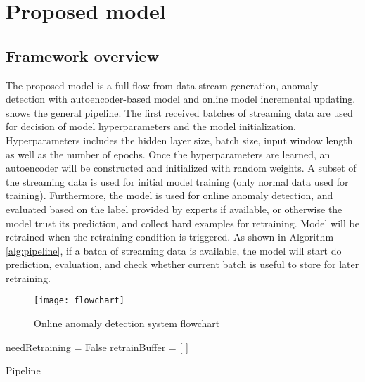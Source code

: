 \chapter{Proposed model}
\label{chap:Proposedmodel}

\section{Framework overview}
\label{sec:framework}

The proposed model is a full flow from data stream generation, anomaly detection with autoencoder-based model and online model incremental updating.  shows the general pipeline. The first received batches of streaming data are used for decision of model hyperparameters and the model initialization. Hyperparameters includes the hidden layer size, batch size, input window length as well as the number of epochs. Once the hyperparameters are learned, an autoencoder will be constructed and initialized with random weights. A subset of the streaming data is used for initial model training (only normal data used for training). Furthermore, the model is used for online anomaly detection, and evaluated based on the label provided by experts if available, or otherwise the model trust its prediction, and collect hard examples for retraining. Model will be retrained when the retraining condition is triggered. As shown in Algorithm \ref{alg:pipeline}, if a batch of streaming data is available, the model will start do prediction, evaluation, and check whether current batch is useful to store for later retraining. 


\begin{figure}[h]
\centering
\texttt{[image: flowchart]}
\caption[Online anomaly detection system flowchart]{Online anomaly detection system flowchart}
\label{fig:flowchart}
\end{figure}

\begin{algorithm}[h]

\BlankLine 
needRetraining = False\;
retrainBuffer = [ ]\;
 \caption{Pipeline}
\label{alg:pipeline}
\end{algorithm}



